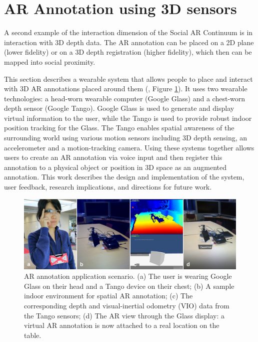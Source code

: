 \pagebreak
\section{AR Annotation using 3D sensors}
\label{sec:3D}

A second example of the interaction dimension of the Social AR Continuum is in interaction with 3D depth data. The AR annotation can be placed on a 2D plane (lower fidelity) or on a 3D depth registration (higher fidelity), which then can be mapped into social proximity. 

This section describes a wearable system that allows people to place and interact with 3D AR annotations placed around them (\cite{Nassani2015a, Nassani2015}, Figure \ref{fig:mgia15:teaser}). It uses two wearable technologies: a head-worn wearable computer (Google Glass) and a chest-worn depth sensor (Google Tango). Google Glass is used to generate and display virtual information to the user, while the Tango is used to provide robust indoor position tracking for the Glass. The Tango enables spatial awareness of the surrounding world using various motion sensors including 3D depth sensing, an accelerometer and a motion-tracking camera. Using these systems together allows users to create an AR annotation via voice input and then register this annotation to a physical object or position in 3D space as an augmented annotation. This work describes the design and implementation of the system, user feedback, research implications, and directions for future work.  

\begin{figure}[ht]
  \centering
  \includegraphics[width=\linewidth]{images/62-3d-mgia15/sampleteaser-01.jpg}
  \caption{AR annotation application scenario. (a) The user is wearing Google Glass on their head and a Tango device on their chest; (b) A sample indoor environment for spatial AR annotation; (c) The corresponding depth and visual-inertial odometry (VIO) data from the Tango sensors; (d) The AR view through the Glass display: a virtual AR annotation is now attached to a real location on the table.}
  \label{fig:mgia15:teaser}
\end{figure}

